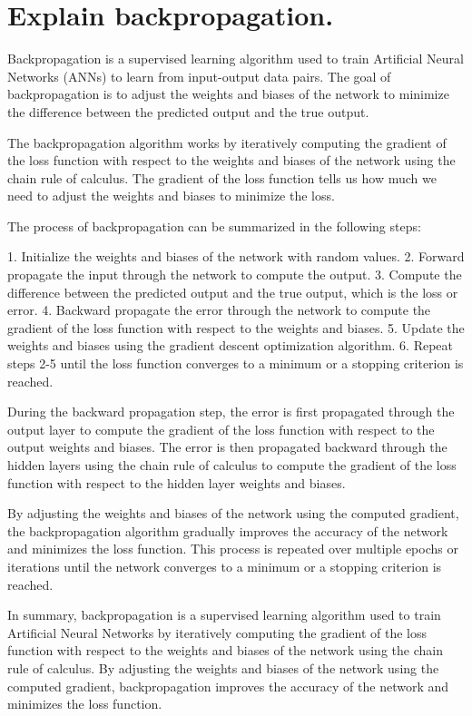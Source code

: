 \section{Explain backpropagation.}
Backpropagation is a supervised learning algorithm used to train Artificial Neural Networks (ANNs) to learn from input-output data pairs. The goal of backpropagation is to adjust the weights and biases of the network to minimize the difference between the predicted output and the true output.

The backpropagation algorithm works by iteratively computing the gradient of the loss function with respect to the weights and biases of the network using the chain rule of calculus. The gradient of the loss function tells us how much we need to adjust the weights and biases to minimize the loss.

The process of backpropagation can be summarized in the following steps:

1. Initialize the weights and biases of the network with random values.
2. Forward propagate the input through the network to compute the output.
3. Compute the difference between the predicted output and the true output, which is the loss or error.
4. Backward propagate the error through the network to compute the gradient of the loss function with respect to the weights and biases.
5. Update the weights and biases using the gradient descent optimization algorithm.
6. Repeat steps 2-5 until the loss function converges to a minimum or a stopping criterion is reached.

During the backward propagation step, the error is first propagated through the output layer to compute the gradient of the loss function with respect to the output weights and biases. The error is then propagated backward through the hidden layers using the chain rule of calculus to compute the gradient of the loss function with respect to the hidden layer weights and biases.

By adjusting the weights and biases of the network using the computed gradient, the backpropagation algorithm gradually improves the accuracy of the network and minimizes the loss function. This process is repeated over multiple epochs or iterations until the network converges to a minimum or a stopping criterion is reached.

In summary, backpropagation is a supervised learning algorithm used to train Artificial Neural Networks by iteratively computing the gradient of the loss function with respect to the weights and biases of the network using the chain rule of calculus. By adjusting the weights and biases of the network using the computed gradient, backpropagation improves the accuracy of the network and minimizes the loss function.

